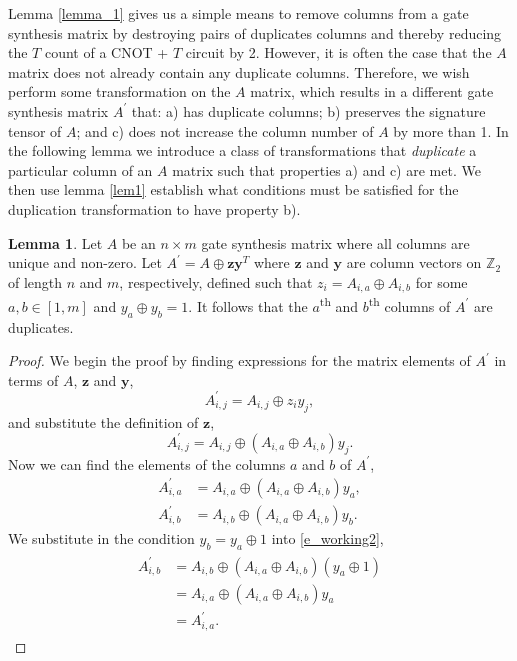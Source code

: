 \documentclass[notitlepage]{article}
\theoremstyle{definition}
\theoremstyle{problem}
\theoremstyle{lemma}
\newtheorem{lemma}{Lemma}[section]
\begin{document}
Lemma \ref{lemma_1} gives us a simple means to remove columns from a gate synthesis matrix by destroying pairs of duplicates columns and thereby reducing the $T$ count of a CNOT + $T$ circuit by 2. However, it is often the case that the $A$ matrix does not already contain any duplicate columns. Therefore, we wish perform some transformation on the $A$ matrix, which results in a different gate synthesis matrix $A^\prime$ that: a) has duplicate columns; b) preserves the signature tensor of $A$; and c) does not increase the column number of $A$ by more than 1. In the following lemma we introduce a class of transformations that \emph{duplicate} a particular column of an $A$ matrix such that properties a) and c) are met. We then use lemma \ref{lem1} establish what conditions must be satisfied for the duplication transformation to have property b).

\theoremstyle{lemma}
\begin{lemma}{}
	\label{lem2}
	Let $A$ be an $n\times m$ gate synthesis matrix where all columns are unique and non-zero. Let $A^\prime = A \oplus \mathbf{z}\mathbf{y}^T$ where $\mathbf{z}$ and $\mathbf{y}$ are column vectors on $\mathbb{Z}_2$ of length $n$ and $m$, respectively, defined such that $z_i = A_{i,a} \oplus A_{i,b}$ for some $a,b\in \left[1,m\right]$ and $y_a \oplus y_b = 1$. It follows that the $a$\textsuperscript{th} and $b$\textsuperscript{th} columns of $A^\prime$ are duplicates.
\end{lemma}
\begin{proof}
	We begin the proof by finding expressions for the matrix elements of $A^\prime$ in terms of $A$, $\mathbf{z}$ and $\mathbf{y}$,
	\begin{equation}
	A^\prime_{i,j} = A_{i,j} \oplus z_i y_j,
	\end{equation}
	and substitute the definition of $\mathbf{z}$,
	\begin{equation}
	A^\prime_{i,j} = A_{i,j} \oplus (A_{i,a}\oplus A_{i,b}) y_j.
	\end{equation}
	Now we can find the elements of the columns $a$ and $b$ of $A^\prime$,
	\begin{align}
	A^\prime_{i,a} &= A_{i,a} \oplus (A_{i,a}\oplus A_{i,b}) y_a,\\
	A^\prime_{i,b} &= A_{i,b} \oplus (A_{i,a}\oplus A_{i,b}) y_b.
	\label{e_working2}
	\end{align}
	We substitute in the condition $y_b = y_a \oplus 1$ into \ref{e_working2},
	\begin{align}
	\begin{split}
	A^\prime_{i,b} &= A_{i,b} \oplus (A_{i,a}\oplus A_{i,b}) (y_a \oplus 1) \\
	&= A_{i,a} \oplus (A_{i,a}\oplus A_{i,b})y_a \\
	& = A^\prime_{i,a}.
	\end{split}			
	\end{align}
\end{proof}
\end{document}
